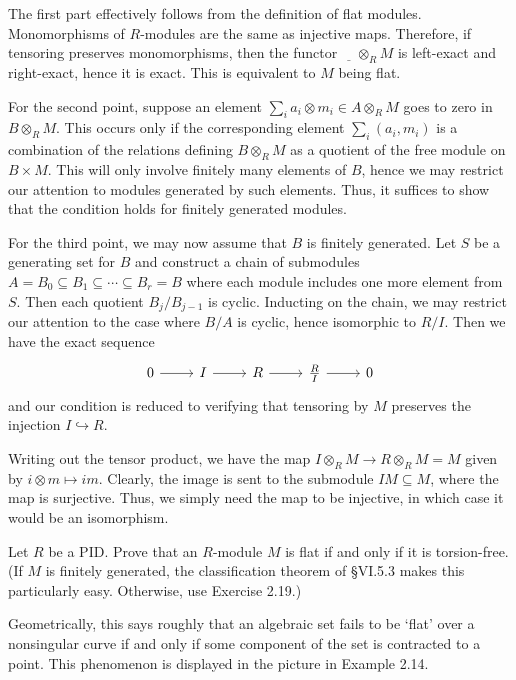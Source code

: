 \documentclass[../../master.tex]{subfiles}
\begin{document}
\begin{solution}
    The first part effectively follows from the definition of flat modules.
    Monomorphisms of $R$-modules are the same as injective maps.
    Therefore, if tensoring preserves monomorphisms, then the functor $\underline{\hspace{1em}} \otimes_R M$ is left-exact and right-exact, hence it is exact.
    This is equivalent to $M$ being flat.

    For the second point, suppose an element $\sum_i a_i \otimes m_i \in A \otimes_R M$ goes to zero in $B \otimes_R M$.
    This occurs only if the corresponding element $\sum_i (a_i, m_i)$ is a combination of the relations defining $B \otimes_R M$ as a quotient of the free module on $B \times M$.
    This will only involve finitely many elements of $B$, hence we may restrict our attention to modules generated by such elements.
    Thus, it suffices to show that the condition holds for finitely generated modules.

    For the third point, we may now assume that $B$ is finitely generated.
    Let $S$ be a generating set for $B$ and construct a chain of submodules $A = B_0 \subseteq B_1 \subseteq \cdots \subseteq B_r = B$ where each module includes one more element from $S$.
    Then each quotient $B_j / B_{j-1}$ is cyclic.
    Inducting on the chain, we may restrict our attention to the case where $B/A$ is cyclic, hence isomorphic to $R/I$.
    Then we have the exact sequence
    \[
    \begin{tikzcd}
        0 & I & R & \frac{R}{I} & 0
        \arrow[from=1-1, to=1-2] 
        \arrow[from=1-2, to=1-3]
        \arrow[from=1-3, to=1-4]
        \arrow[from=1-4, to=1-5] 
    \end{tikzcd}
    \]
    and our condition is reduced to verifying that tensoring by $M$ preserves the injection $I \hookrightarrow R$.

    Writing out the tensor product, we have the map $I \otimes_R M \to R \otimes_R M = M$ given by $i \otimes m \mapsto im$.
    Clearly, the image is sent to the submodule $IM \subseteq M$, where the map is surjective.
    Thus, we simply need the map to be injective, in which case it would be an isomorphism.
\end{solution}

\begin{problem}
    Let $R$ be a PID.
    Prove that an $R$-module $M$ is flat if and only if it is torsion-free.
    (If $M$ is finitely generated, the classification theorem of \S VI.5.3 makes this particularly easy.
    Otherwise, use Exercise 2.19.)

    Geometrically, this says roughly that an algebraic set fails to be `flat' over a nonsingular curve if and only if some component of the set is contracted to a point.
    This phenomenon is displayed in the picture in Example 2.14.
\end{problem}
\end{document}
